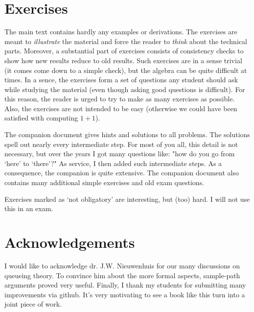 \section*{Exercises}

The main text contains hardly any examples or derivations.
The exercises are meant to \emph{illustrate} the material and force the reader to \textit{think} about the technical parts.
Moreover, a substantial part of exercises consists of consistency checks to show how new results reduce to old results.
Such exercises are in a sense trivial (it comes come down to a simple check), but the algebra can be quite difficult at times.
In a sence, the exercises form a set of questions any student should ask while studying the material (even though asking good questions is difficult).
For this reason, the reader is urged to try to make as many exercises as possible.
Also, the exercises are not intended to be  easy (otherwise we could have been satisfied with computing $1+1$).

The companion document gives hints and solutions to all problems.
The solutions spell out nearly every intermediate step.
For most of you all, this detail is not necessary, but over the years I got many questions like: "how do you go from `here' to `there'?"
As service, I then added such intermediate steps.
As a consequence, the companion is quite extensive.
The companion document also contains many additional simple exercises and old exam questions.

Exercises marked as `not obligatory' are interesting, but (too) hard.
I will not use this in an exam.

\section*{Acknowledgements}

I would like to acknowledge dr.
J.W.
Nieuwenhuis for our many discussions on queueing theory.
To convince him about the more formal aspects, sample-path arguments proved very useful.
Finally, I thank my students for submitting many improvements via github.
It's very motivating to see a book like this turn into a joint piece of work.



